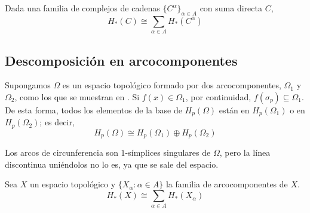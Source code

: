 \begin{lemma}
Dada una familia de complejos de cadenas $\{C^\alpha\}_{\alpha \in A}$ con suma
directa $C$,
\[H_*(C)\cong\sum_{\alpha \in A}H_*(C^\alpha)\]
\end{lemma}

\subsection{Descomposición en arcocomponentes}
Supongamos $\Omega$ es un espacio topológico formado por dos arcocomponentes,
$\Omega_1$ y $\Omega_2$, como los que se muestran en . Si
$f(x) \in \Omega_1$, por continuidad, $f(\sigma_p) \subseteq \Omega_1$. De esta
forma, todos los elementos de la base de $H_p(\Omega)$ están en $H_p(\Omega_1)$ o
en $H_p(\Omega_2)$; es decir,
\[H_p(\Omega)\cong H_p(\Omega_1)\oplus H_p(\Omega_2)\]

\begin{marginfigure}
\centering
{}
\caption{Los
arcos de circunferencia son $1$-símplices singulares de $\Omega$, pero la línea
discontinua uniéndolos no lo es, ya que se sale del espacio.}
\end{marginfigure}

\begin{proposition}
 Sea $X$ un espacio topológico y $\{X_\alpha\colon \alpha \in
A\}$ la familia de arcocomponentes de $X$.
\[H_*(X) \cong \sum_{\alpha \in A} H_*(X_\alpha)\]
\end{proposition}

